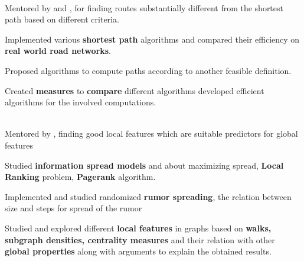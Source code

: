 \documentclass[a4paper]{norm-resume}
\begin{document}
	\vspace{1mm}
	
				
	
\vspace{-2mm} %

	\begin{changemargin}{1.0cm}{0.0cm} 
	{
	\large{}  \\
	\small{Mentored by  and , for finding routes substantially different from the shortest path based on different criteria.} 
	\begin{tightitemize}
	\small
	{
	\item Implemented various \textbf{shortest path} algorithms and compared their efficiency on \textbf{real world road networks}.
	\item Proposed algorithms to compute paths according to another feasible definition.
	\item Created \textbf{measures} to \textbf{compare} different algorithms developed efficient algorithms for the involved computations.
	}
	\end{tightitemize}
	
\vspace{1mm} %
			
	\large{} \\
	\small{Mentored by , finding good local features which are suitable predictors for global features}
	\begin{tightitemize}
	\small
	{
	\item Studied \textbf{information spread models} and about maximizing spread, \textbf{Local Ranking} problem, \textbf{Pagerank} algorithm. 
	\item Implemented and studied randomized \textbf{rumor spreading}, the relation between size and steps for spread of the rumor
	\item Studied and explored different \textbf{local features} in graphs based on \textbf{walks, subgraph densities, centrality measures} and their relation with other \textbf{global properties} along with arguments to explain the obtained results.
	}
	\end{tightitemize}
 	
	}
	\end{changemargin} 	
\end{document}
